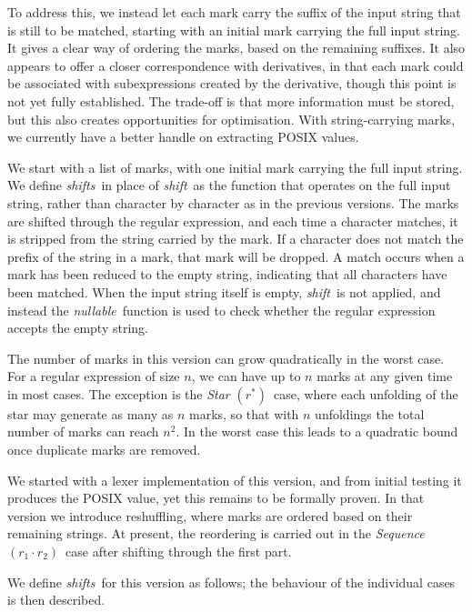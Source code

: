 \documentclass[12pt]{article}
\newcommand{\shift}{\textit{shift}}
\newcommand{\shifts}{\textit{shifts}}
\newcommand{\nullable}{\textit{nullable}}
\newcommand{\STARText}{\textit{Star} $(r^*)$}
\newcommand{\SEQText}{ \textit{Sequence} $(r_1 \cdot r_2)$}
\begin{document}
To address this, we instead let each mark carry the suffix of the input string that is still to be matched, starting with an initial mark carrying the full 
input string. It gives a clear way of ordering the marks,  
based on the remaining suffixes.  
It also appears to offer a closer correspondence with derivatives,  
in that each mark could be associated with subexpressions created by the derivative,  
though this point is not yet fully established. 
The trade-off is that more information must be 
stored, but this also creates opportunities for optimisation. With string-carrying marks, we currently have a better handle on extracting POSIX values.


We start with a list of marks, with one initial mark carrying the full input string.
We define \shifts\ in place of \shift\ as the function that operates on the full input 
string, rather than character by character as in the previous versions.
The marks are shifted through the regular expression, and each time a character matches, 
it is stripped from the string carried by the mark.
If a character does not match the prefix of the string in a mark, that mark will be dropped.
A match occurs when a mark has been reduced to the empty string,
indicating that all characters have been matched.
When the input string itself is empty, \shift\ is not applied,
and instead the \nullable\ function is used to check whether the 
regular expression accepts the empty string.

The number of marks in this version can grow quadratically in the worst case. 
For a regular expression of size $n$, we can have up to $n$ marks at any given time in most cases. 
The exception is the \STARText\ case, where each unfolding of the star may generate as many as $n$ marks, 
so that with $n$ unfoldings the total number of marks can reach $n^2$. 
In the worst case this leads to a quadratic bound once duplicate marks are removed.

We started with a lexer implementation of this version, and from initial testing it produces the POSIX value, 
yet this remains to be formally proven. 
In that version we introduce reshuffling, where marks are ordered based on their remaining strings. 
At present, the reordering is carried out in the \SEQText\ case after shifting through the first part.

We define \shifts\ for this version as follows; the behaviour of the individual cases is then described.
\end{document}
